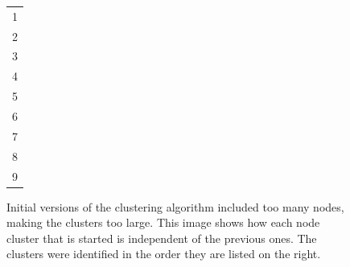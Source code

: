 \begin{figure}[tbhp]
	\begin{minipage}[c]{0.80\linewidth}
		\centering
	\end{minipage}%
	\quad
	\begin{minipage}[c]{0.1\linewidth}
		\centering
		\begin{tabular}[b]{ l }
			\cellcolor{lyellow}1\\
			\cellcolor{lorange}2\\
			\cellcolor{lbrown}3\\
			\cellcolor{lgreen}4\\
			\cellcolor{lblue}5\\
			\cellcolor{lpurple}6\\
			\cellcolor{lred}7\\
			\cellcolor{silver}8\\
			\cellcolor{lgrey}9\\
		\end{tabular}
	\end{minipage}
	\caption{Initial versions of the clustering algorithm included too many
	nodes, making the clusters too large. This image shows how each node
	cluster that is started is independent of the previous ones. The clusters
	were identified in the order they are listed on the right.}
	\label{fig:multiple-clusters-colours}
\end{figure}

